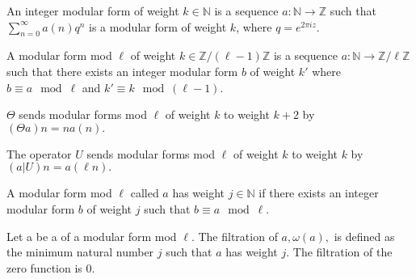 \begin{definition} 
  \label{def:IntegerModularForm}
  \leanok
  An integer modular form of weight $k \in \mathbb{N}$ is a sequence $a : \mathbb{N} → \mathbb{Z}$
  such that $\sum_{n=0}^{\infty} a(n) q^n$ is a modular form of weight $k$, where $q = e ^ {2 \pi i z}.$
\end{definition}

\begin{definition} 
  \label{def:ModularFormMod}
  \leanok
  A modular form mod $\ell$ of weight $k \in \mathbb{Z} / (\ell - 1) \mathbb{Z}$ is a sequence $a : \mathbb{N} → \mathbb{Z} / \ell \mathbb{Z}$
  such that there exists an integer modular form $b$ of weight $k'$ where
  $b \equiv a \mod \ell$ and $k' \equiv k \mod (\ell - 1)$.
\end{definition}


\begin{definition} [Theta]
  \label{def:Theta}
  \leanok
  $\Theta$ sends modular forms mod $\ell$ of weight $k$ to weight $k + 2$ by \\
  $(\Theta a) n = n a(n).$

\end{definition}

\begin{definition} [U Operator]
  \label{def:U_Operator}
  \leanok
  The operator $U$ sends modular forms mod $\ell$ of weight $k$ to weight $k$ by \\
  $ (a|U) n = a(\ell n).$
\end{definition}

\begin{definition} [hasWeight]
  \label{def:hasWeight}
  \leanok
  A modular form mod $\ell$ called $a$ has weight $j \in \mathbb{N}$ if
  there exists an integer modular form $b$ of weight $j$ such that $b \equiv a \mod \ell$.
\end{definition}

\begin{definition} [Filtration]
  \label{def:Filtration}
  \leanok
  Let a be a of a modular form mod $\ell$. The filtration of $a, \omega (a), $ 
  is defined as the minimum natural number $j$ such that $a$ has weight $j$. 
  The filtration of the zero function is $0$.
\end{definition}

